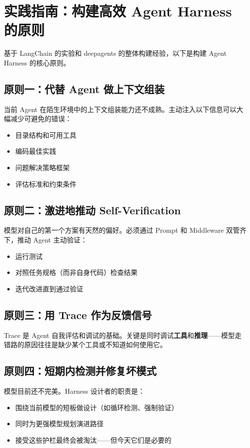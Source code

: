 \section{实践指南：构建高效 Agent Harness 的原则}

基于 LangChain 的实验和 deepagents 的整体构建经验，以下是构建 Agent Harness 的核心原则。

\subsection{原则一：代替 Agent 做上下文组装}

当前 Agent 在陌生环境中的上下文组装能力还不成熟。主动注入以下信息可以大幅减少可避免的错误：

\begin{itemize}[leftmargin=1.5em]
    \item 目录结构和可用工具
    \item 编码最佳实践
    \item 问题解决策略框架
    \item 评估标准和约束条件
\end{itemize}

\subsection{原则二：激进地推动 Self-Verification}

模型对自己的第一个方案有天然的偏好。必须通过 Prompt 和 Middleware 双管齐下，推动 Agent 主动验证：
\begin{itemize}[leftmargin=1.5em]
    \item 运行测试
    \item 对照任务规格（而非自身代码）检查结果
    \item 迭代改进直到通过验证
\end{itemize}

\subsection{原则三：用 Trace 作为反馈信号}

Trace 是 Agent 自我评估和调试的基础。关键是同时调试\textbf{工具}和\textbf{推理}——模型走错路的原因往往是缺少某个工具或不知道如何使用它。

\subsection{原则四：短期内检测并修复坏模式}

模型目前还不完美。Harness 设计者的职责是：
\begin{itemize}[leftmargin=1.5em]
    \item 围绕当前模型的短板做设计（如循环检测、强制验证）
    \item 同时为更强模型规划演进路径
    \item 接受这些护栏最终会被淘汰——但今天它们是必要的
\end{itemize}

